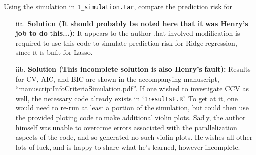 \documentclass[11pt]{article}
\begin{document}
\begin{enumerate}
\begin{itemize}
\begin{itemize}
      Using the simulation in {\tt 1\_simulation.tar}, compare the prediction risk
      for
      \begin{itemize}
      \item[iia.]  \textbf{Solution (It should probably be noted here that it
          was Henry's job to do this...):} It appears to the author that
        involved modification is required to use this code to simulate
        prediction risk for Ridge regression, since it is built for Lasso.
      \item[iib.]  \textbf{Solution (This incomplete solution is also Henry's
          fault):} Results for CV, AIC, and BIC are shown in the accompanying
        manuscript, ``manuscriptInfoCriteriaSimulation.pdf''. If one wished to
        investigate CCV as well, the necessary code already exists in
        `\verb=1resultsF.R='. To get at it, one would need to re-run at least a
        portion of the simulation, but could then use the provided ploting code
        to make additional violin plots. Sadly, the author himself was unable to
        overcome errors associated with the parallelization aspects of the code,
        and so generated no such violin plots. He wishes all other lots of luck,
        and is happy to share what he's learned, however incomplete.
      \end{itemize}
    \end{itemize}
  \end{itemize}

\end{enumerate}

\end{document}
